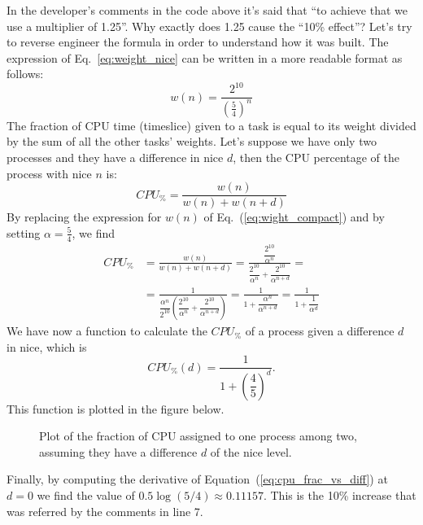 In the developer's comments in the code above it's said that ``to achieve that we use a multiplier of 1.25''. Why exactly does 1.25 cause the ``10\% effect''? Let's try to reverse engineer the formula in order to understand how it was built. The expression of Eq.~\eqref{eq:weight_nice} can be written in a more readable format as follows:
\begin{equation}
    w(n) = \frac{2^{10}}{\left(\frac{5}{4}\right)^{n}}
    \label{eq:wight_compact}
\end{equation}
The fraction of CPU time (timeslice) given to a task is equal to its weight divided by the sum of all the other tasks' weights. Let's suppose we have only two processes and they have a difference in nice $d$, then the CPU percentage of the process with nice $n$ is:
\begin{equation}
    CPU_\% = \frac{w(n)}{w(n)+w(n+d)}
\end{equation}
By replacing the expression for $w(n)$ of Eq.~(\ref{eq:wight_compact}) and by setting $\alpha=\frac{5}{4}$, we find
\begin{align*}
    CPU_\% &=\frac{w(n)}{w(n)+w(n+d)}=
    \frac{\dfrac{2^{10}}{\alpha^{n}}}{\dfrac{2^{10}}{\alpha^{n}}+\dfrac{2^{10}}{\alpha^{n+d}}} =\\
    &=\frac{1}{\dfrac{\alpha^{n}}{2^{10}} \left(\dfrac{2^{10}}{\alpha^{n}}+\dfrac{2^{10}}{\alpha^{n+d}}\right)} =
    \frac{1}{1+\dfrac{\alpha^{n}}{\alpha^{n+d}}} =
    \frac{1}{1+\dfrac{1}{\alpha^{d}}}
\end{align*}
We have now a function to calculate the $CPU_\%$ of a process given a difference $d$ in nice, which is
\begin{equation}
    CPU_\%(d)=\frac{1}{1+\left(\dfrac{4}{5}\right)^{d}}.
    \label{eq:cpu_frac_vs_diff}
\end{equation}
This function is plotted in the figure below.
\begin{figure}[htb]
\centering
{}
\label{fig:plot_cpu}
\caption{Plot of the fraction of CPU assigned to one process among two, assuming they have a difference $d$ of the nice level.}
\end{figure}
Finally, by computing the derivative of Equation~(\ref{eq:cpu_frac_vs_diff}) at $d=0$ we find the value of $0.5\log(5/4)\approx 0.11157$. This is the 10\% increase that was referred by the comments in line 7. 

